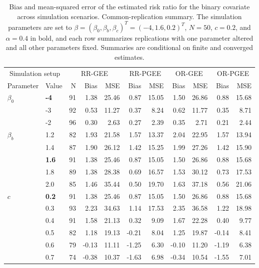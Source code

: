 \begin{table}[htbp]
\centering
\scriptsize
\setlength{\tabcolsep}{4pt}
\renewcommand{\arraystretch}{1.15}
\caption{Bias and mean-squared error of the estimated risk ratio for the binary covariate across simulation scenarios. Common-replication summary. The simulation parameters are set to $\beta = (\beta_0, \beta_b, \beta_c)^T = (-4, 1.6, 0.2)^T$, $N = 50$, $c = 0.2$, and $\alpha = 0.4$ in bold, and each row summarizes replications with one parameter altered and all other parameters fixed. Summaries are conditional on finite and converged estimates.}
\begin{tabular}{ll|rrr|rr|rr|rr}
\hline
\multicolumn{2}{c|}{Simulation setup} & \multicolumn{3}{c|}{RR-GEE} & \multicolumn{2}{c|}{RR-PGEE} & \multicolumn{2}{c|}{OR-GEE} & \multicolumn{2}{c}{OR-PGEE} \\
Parameter & Value & N & Bias & MSE & Bias & MSE & Bias & MSE & Bias & MSE \\
\hline
$\beta_0$ & \textbf{-4} & 91 & 1.38 & 25.46 & 0.87 & 15.05 & 1.50 & 26.86 & 0.88 & 15.68 \\
 & -3 & 92 & 0.53 & 11.27 & 0.37 & 8.24 & 0.62 & 11.77 & 0.35 & 8.71 \\
 & -2 & 96 & 0.30 & 2.63 & 0.27 & 2.39 & 0.35 & 2.71 & 0.21 & 2.44 \\
\hline
$\beta_b$ & 1.2 & 82 & 1.93 & 21.58 & 1.57 & 13.37 & 2.04 & 22.95 & 1.57 & 13.94 \\
 & 1.4 & 87 & 1.90 & 26.12 & 1.42 & 15.25 & 1.99 & 27.26 & 1.42 & 15.90 \\
 & \textbf{1.6} & 91 & 1.38 & 25.46 & 0.87 & 15.05 & 1.50 & 26.86 & 0.88 & 15.68 \\
 & 1.8 & 89 & 1.38 & 28.38 & 0.69 & 16.57 & 1.53 & 30.12 & 0.73 & 17.53 \\
 & 2.0 & 85 & 1.46 & 35.44 & 0.50 & 19.70 & 1.63 & 37.18 & 0.56 & 21.06 \\
\hline
$c$ & \textbf{0.2} & 91 & 1.38 & 25.46 & 0.87 & 15.05 & 1.50 & 26.86 & 0.88 & 15.68 \\
 & 0.3 & 93 & 2.23 & 34.63 & 1.14 & 17.53 & 2.35 & 36.58 & 1.22 & 18.98 \\
 & 0.4 & 91 & 1.58 & 21.13 & 0.32 & 9.09 & 1.67 & 22.28 & 0.40 & 9.77 \\
 & 0.5 & 82 & 1.18 & 19.13 & -0.21 & 8.04 & 1.25 & 19.87 & -0.14 & 8.41 \\
 & 0.6 & 79 & -0.13 & 11.11 & -1.25 & 6.30 & -0.10 & 11.20 & -1.19 & 6.38 \\
 & 0.7 & 74 & -0.38 & 10.37 & -1.63 & 6.98 & -0.34 & 10.54 & -1.55 & 7.01 \\

\end{tabular}
\end{table}
